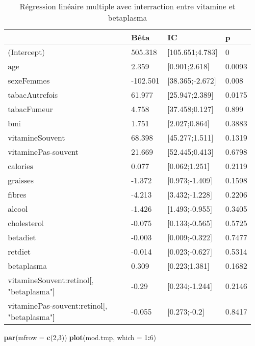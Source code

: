 \documentclass[]{article}
\newenvironment{Shaded}{\begin{snugshade}}{\end{snugshade}}
\newcommand{\KeywordTok}[1]{\textcolor[rgb]{0.13,0.29,0.53}{\textbf{#1}}}
\newcommand{\DataTypeTok}[1]{\textcolor[rgb]{0.13,0.29,0.53}{#1}}
\newcommand{\DecValTok}[1]{\textcolor[rgb]{0.00,0.00,0.81}{#1}}
\newcommand{\OperatorTok}[1]{\textcolor[rgb]{0.81,0.36,0.00}{\textbf{#1}}}
\newcommand{\NormalTok}[1]{#1}
\begin{document}
\begin{table}

\caption{\label{tab:unnamed-chunk-73}Régression linéaire multiple avec interraction entre vitamine et betaplasma}
\centering
\begin{tabular}[t]{l|l|l|l}
\hline
  & Bêta & IC & p\\
\hline
\rowcolor[HTML]{BBD2E1}  (Intercept) & 505.318 & [105.651;4.783] & 0\\
\hline
age & 2.359 & [0.901;2.618] & 0.0093\\
\hline
\rowcolor[HTML]{BBD2E1}  sexeFemmes & -102.501 & [38.365;-2.672] & 0.008\\
\hline
tabacAutrefois & 61.977 & [25.947;2.389] & 0.0175\\
\hline
\rowcolor[HTML]{BBD2E1}  tabacFumeur & 4.758 & [37.458;0.127] & 0.899\\
\hline
bmi & 1.751 & [2.027;0.864] & 0.3883\\
\hline
\rowcolor[HTML]{BBD2E1}  vitamineSouvent & 68.398 & [45.277;1.511] & 0.1319\\
\hline
vitaminePas-souvent & 21.669 & [52.445;0.413] & 0.6798\\
\hline
\rowcolor[HTML]{BBD2E1}  calories & 0.077 & [0.062;1.251] & 0.2119\\
\hline
graisses & -1.372 & [0.973;-1.409] & 0.1598\\
\hline
\rowcolor[HTML]{BBD2E1}  fibres & -4.213 & [3.432;-1.228] & 0.2206\\
\hline
alcool & -1.426 & [1.493;-0.955] & 0.3405\\
\hline
\rowcolor[HTML]{BBD2E1}  cholesterol & -0.075 & [0.133;-0.565] & 0.5725\\
\hline
betadiet & -0.003 & [0.009;-0.322] & 0.7477\\
\hline
\rowcolor[HTML]{BBD2E1}  retdiet & -0.014 & [0.023;-0.627] & 0.5314\\
\hline
betaplasma & 0.309 & [0.223;1.381] & 0.1682\\
\hline
\rowcolor[HTML]{BBD2E1}  vitamineSouvent:retinol[, "betaplasma"] & -0.29 & [0.234;-1.244] & 0.2146\\
\hline
vitaminePas-souvent:retinol[, "betaplasma"] & -0.055 & [0.273;-0.2] & 0.8417\\
\hline
\end{tabular}
\end{table}

\begin{Shaded}
\begin{Highlighting}[]
\KeywordTok{par}\NormalTok{(}\DataTypeTok{mfrow =} \KeywordTok{c}\NormalTok{(}\DecValTok{2}\NormalTok{,}\DecValTok{3}\NormalTok{))}
\KeywordTok{plot}\NormalTok{(mod.tmp, }\DataTypeTok{which =} \DecValTok{1}\OperatorTok{:}\DecValTok{6}\NormalTok{)}
\end{Highlighting}
\end{Shaded}
\end{document}
